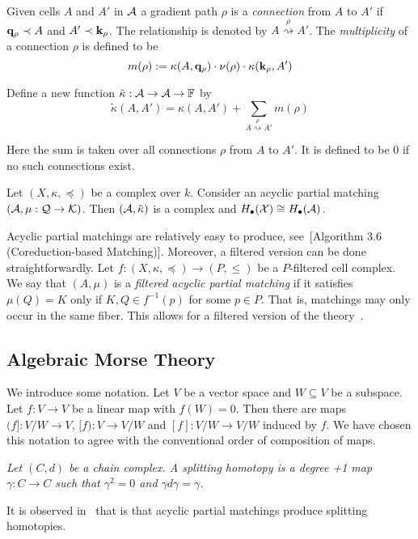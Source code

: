 Given cells $A$ and $A'$ in ${\mathcal A}$ a gradient path $\rho$ is a {\em connection} from $A$ to $A'$ if ${\bf q}_\rho\prec A$ and $A'\prec {\bf k}_\rho$.  The relationship is denoted by $A\stackrel{\rho}{\rightsquigarrow} A'$.  The {\em multiplicity} of a connection $\rho$ is defined to be $$m(\rho):= \kappa(A,{\bf q}_\rho)\cdot \nu(\rho)\cdot \kappa({\bf k}_\rho,A')$$

Define a new function $\tilde \kappa:{\mathcal A}\to {\mathcal A}\to {\mathbb{F}}$ by $$\tilde\kappa (A,A')=\kappa(A,A')+\sum_{A\stackrel{\rho}{\rightsquigarrow} A'} m(\rho)$$

Here the sum is taken over all connections $\rho$ from $A$ to $A'$.  It is defined to be 0 if no such connections exist.

\begin{prop}
Let $(X,\kappa,\preceq)$ be a complex over $k$.  Consider an acyclic partial matching $({\mathcal A},\mu:{\mathcal Q}\to {\mathcal K})$.  Then $({\mathcal A},\tilde \kappa)$ is a complex and $H_\bullet({\mathcal X})\cong H_\bullet({\mathcal A})$.
\end{prop}

Acyclic partial matchings are relatively easy to produce, see~[Algorithm 3.6 (Coreduction-based Matching)]\cite{focm}.  Moreover, a filtered version can be done straightforwardly.  
Let $f:(X,\kappa,\preceq)\to (P,\leq)$ be a $P$-filtered cell complex.  We say that $(A,\mu)$ is a {\em filtered acyclic partial matching} if it satisfies $\mu(Q)=K$ only if $K,Q\in f^{-1}(p)$ for some $p\in P$.  That is, matchings may only occur in the same fiber.  This allows for a filtered version of the theory~\cite{mn}.
 
 \subsection{Algebraic Morse Theory}
 
 We introduce some notation.  Let $V$ be a vector space and $W\subseteq V$ be a subspace.  Let $f:V\to V$ be a linear map with $f(W)=0$.  Then there are maps $(f]:V/W\to V$, $[f):V\to V/W$ and $[f]:V/W\to V/W$ induced by $f$.   We have chosen this notation to agree with the conventional order of composition of maps.

\begin{defn}
{\em
Let $(C,d)$ be a chain complex.  A {\em splitting homotopy} is a degree +1 map $\gamma:C\to C$ such that $\gamma^2=0$ and $\gamma d\gamma = \gamma$.
}
\end{defn}


It is observed in~\cite{sko,focm} that is that acyclic partial matchings produce splitting homotopies.

